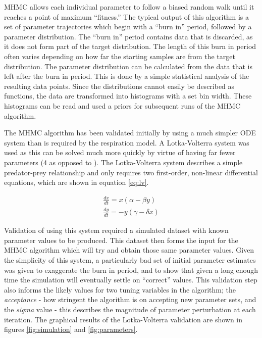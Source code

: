 MHMC allows each individual parameter to follow a biased random walk until it reaches a point of maximum ``fitness.'' The typical output of this algorithm is a set of parameter trajectories which begin with a ``burn in'' period, followed by a parameter distribution. The ``burn in'' period contains data that is discarded, as it does not form part of the target distribution. The length of this burn in period often varies depending on how far the starting samples are from the target distribution. The parameter distribution can be calculated from the data that is left after the burn in period. This is done by a simple statistical analysis of the resulting data points. Since the distributions cannot easily be described as functions, the data are transformed into histograms with a set bin width. These histograms can be read and used a priors for subsequent runs of the MHMC algorithm.

The MHMC algorithm has been validated initially by using a much simpler ODE system than is required by the respiration model. A Lotka-Volterra system was used as this can be solved much more quickly by virtue of having far fewer parameters (4 as opposed to ). The Lotka-Volterra system describes a simple predator-prey relationship and only requires two first-order, non-linear differential equations, which are shown in equation \ref{eq:lv}.

\begin{eqnarray}
\frac{dx}{dt} = x (\alpha - \beta y)\nonumber \\
\frac{dy}{dt} = -y (\gamma - \delta x)
\label{eq:lv}
\end{eqnarray}

Validation of using this system required a simulated dataset with known parameter values to be produced. This dataset then forms the input for the MHMC algorithm which will try and obtain those same parameter values. Given the simplicity of this system, a particularly bad set of initial parameter estimates was given to exaggerate the burn in period, and to show that given a long enough time the simulation will eventually settle on ``correct'' values. This validation step also informs the likely values for two tuning variables in the algorithm; the \textit{acceptance} - how stringent the algorithm is on accepting new parameter sets, and the \textit{sigma} value - this describes the magnitude of parameter perturbation at each iteration.
The graphical results of the Lotka-Volterra validation are shown in figures \ref{fig:simulation} and \ref{fig:parameters}.

